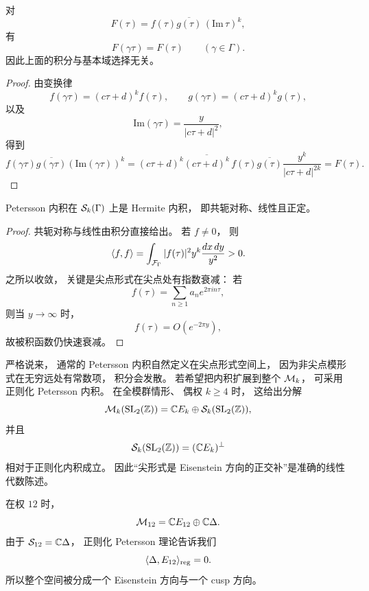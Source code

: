\begin{proposition} 对 \[ F(\tau)=f(\tau)\overline{g(\tau)}\,(\mathrm{Im}\,\tau)^k, \] 有 \[ F(\gamma\tau)=F(\tau) \qquad(\gamma\in\Gamma). \] 因此上面的积分与基本域选择无关。 \end{proposition}




\begin{proof} 由变换律 \[ f(\gamma\tau)=(c\tau+d)^k f(\tau),\qquad g(\gamma\tau)=(c\tau+d)^k g(\tau), \] 以及 \[ \mathrm{Im}(\gamma\tau)=\frac{y}{|c\tau+d|^2}, \] 得到 \[ f(\gamma\tau)\overline{g(\gamma\tau)}(\mathrm{Im}(\gamma\tau))^k = (c\tau+d)^k\overline{(c\tau+d)^k} \,f(\tau)\overline{g(\tau)} \frac{y^k}{|c\tau+d|^{2k}} = F(\tau). \] \end{proof}




\begin{proposition} Petersson 内积在 $\mathcal{S}_k(\Gamma)$ 上是 Hermite 内积， 即共轭对称、线性且正定。 \end{proposition}




\begin{proof} 共轭对称与线性由积分直接给出。 若 $f\ne0$， 则 \[ \langle f, f \rangle = \int_{\mathcal F_\Gamma}|f(\tau)|^2 y^k \frac{dx\,dy}{y^2}>0. \] 之所以收敛， 关键是尖点形式在尖点处有指数衰减： 若 \[ f(\tau)=\sum_{n\ge1}a_n e^{2\pi in\tau}, \] 则当 $y\to\infty$ 时， \[ f(\tau)=O(e^{-2\pi y}), \] 故被积函数仍快速衰减。 \end{proof}




\begin{remark} 严格说来， 通常的 Petersson 内积自然定义在尖点形式空间上， 因为非尖点模形式在无穷远处有常数项， 积分会发散。 若希望把内积扩展到整个 $\mathcal{M}_k$， 可采用正则化 Petersson 内积。 在全模群情形、 偶权 $k\ge4$ 时， 这给出分解 \[ \mathcal{M}_k(\mathrm{SL}_2(\mathbb{Z})) = \mathbb{C} E_k \oplus \mathcal{S}_k(\mathrm{SL}_2(\mathbb{Z})), \] 并且 \[ \mathcal{S}_k(\mathrm{SL}_2(\mathbb{Z})) = (\mathbb{C} E_k)^\perp \] 相对于正则化内积成立。 因此“尖形式是 Eisenstein 方向的正交补”是准确的线性代数陈述。 \end{remark}




\begin{example} 在权 $12$ 时， \[ \mathcal{M}_{12}=\mathbb{C} E_{12}\oplus \mathbb{C}\Delta. \] 由于 $\mathcal{S}_{12}=\mathbb{C}\Delta$， 正则化 Petersson 理论告诉我们 \[ \langle \Delta, E_{12} \rangle_{\mathrm{reg}}=0. \] 所以整个空间被分成一个 Eisenstein 方向与一个 cusp 方向。 \end{example}




